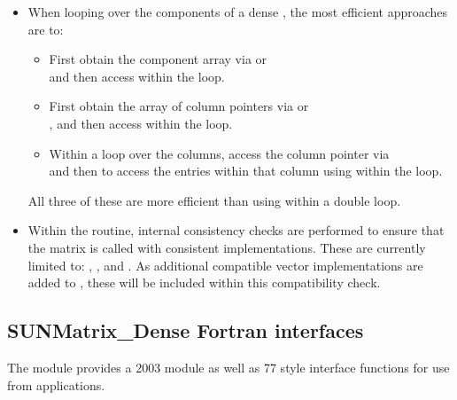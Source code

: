 \begin{itemize}

\item
  When looping over the components of a dense  ,
  the most efficient approaches are to:
  \begin{itemize}
    \item First obtain the component array via  or\\
     and then
    access  within the loop.

    \item First obtain the array of column pointers via  or\\
    , and then
    access  within the loop.

    \item Within a loop over the columns, access the column pointer via\\
     and then to access the
    entries within that column using  within the loop.
  \end{itemize}
  All three of these are more efficient than
  using  within a double loop.

\item
  {\warn} Within the  routine, internal
  consistency checks are performed to ensure that the matrix is called
  with consistent {\nvector} implementations.  These are currently
  limited to: {\nvecs}, {\nvecopenmp}, and {\nvecpthreads}.  As additional
  compatible vector implementations are added to {\sundials}, these
  will be included within this compatibility check.

\end{itemize}



\subsection{SUNMatrix\_Dense Fortran interfaces}
\label{ss:sunmat_dense_fortran}

The {\sunmatdense} module provides a {\F} 2003 module as well as {\F} 77
style interface functions for use from {\F} applications.

